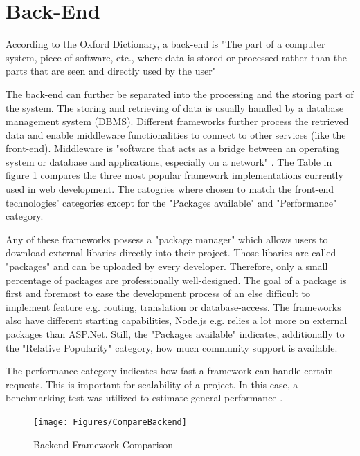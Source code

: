 \section{Back-End}

According to the Oxford Dictionary, a back-end is 
"The part of a computer system, piece of software, etc., where data is stored or processed rather 
than the parts that are seen and directly used by the user" \parencite{backendDef}

The back-end can further be separated into the processing and the storing part of the system.
The storing and retrieving of data is usually handled by a database management system (DBMS).
Different frameworks further process the retrieved data and enable middleware functionalities to connect to other services (like the front-end).
Middleware is "software that acts as a bridge between an operating 
system or database 
and applications, especially on a network" \parencite{middlewaredef}. 
The Table in figure \ref{fig:CompareBackend} 
compares the three most popular framework implementations currently used in web development.
The catogries where chosen to match the front-end technologies' categories
except for the "Packages available" and "Performance" category.

Any of these frameworks possess a "package manager" which allows users to download external libaries directly into their project. 
Those libaries are called "packages" and can be uploaded by every developer.
Therefore, only a small percentage of packages are professionally well-designed. 
The goal of a package is first and foremost to ease the development process of an else difficult to implement feature e.g. routing, translation or database-access.
The frameworks also have different starting capabilities, Node.js e.g. relies a lot more on external packages than ASP.Net.
Still, the "Packages available" indicates, additionally to the "Relative Popularity" category, how much community support is available.

The performance category indicates how fast a framework can handle certain requests. 
This is important for scalability of a project. 
In this case, a benchmarking-test was utilized to estimate general performance \parencite{benchmarkNode.NET}.

\begin{figure}[b]
	\centering
    \texttt{[image: Figures/CompareBackend]}
	\decoRule
	\caption[Backend Framework Comparison]{Backend Framework Comparison}
	\label{fig:CompareBackend}
\end{figure}

